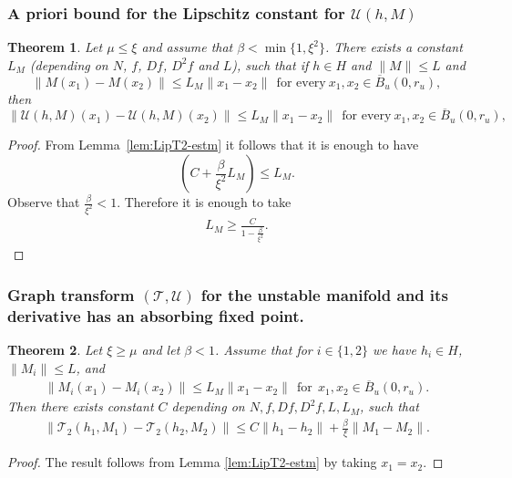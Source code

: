 \documentclass[11pt, leqno]{amsart}
\newtheorem{thm}{Theorem}[section]
\theoremstyle{definition}
\begin{document}
\subsubsection{A priori bound for the Lipschitz constant for $\mathcal{U}(h,M)$}
\begin{thm}
\label{thm:T2-a-priori-bnds}
  Let $\mu\leq \xi$ and assume that $\beta<\min\{1,\xi^2\}$. There exists a constant $L_M$ (depending on $N$, $f$, $Df$, $D^2f$ and $L$), such that  if $h \in H$  and $\|M\| \leq L $ and
   \begin{equation}
  \|M(x_1) - M(x_2)\| \leq L_M \|x_1-x_2\|\ \ \textrm{for every} \ x_1,x_2\in \overline{B}_u(0,r_u),  \label{eq:Lip-M}
\end{equation}
then
\begin{equation}
  \|\mathcal{U}(h,M)(x_1) - \mathcal{U}(h,M)(x_2)\| \leq L_M \|x_1-x_2\|\ \ \textrm{for every} \ x_1,x_2\in \overline{B}_u(0,r_u),  \label{eq:Lip-preserved}
\end{equation}
\end{thm}
\begin{proof}
From Lemma~\ref{lem:LipT2-estm}  it follows that it is enough to have
\begin{equation*}
  \left(C + \frac{\beta}{\xi^2} L_M \right)  \leq L_M.
\end{equation*}
Observe that $\frac{\beta}{\xi^2} < 1$.
Therefore it is enough to take
\begin{eqnarray*}
  L_M \geq \frac{C}{1 - \frac{\beta}{\xi^2} }.
\end{eqnarray*}
\end{proof}





\subsubsection{Graph transform  $(\mathcal{T}, \mathcal{U})$ for the unstable manifold and its derivative has an absorbing fixed point.}

\begin{thm}
\label{thm:DT-contr}
Let $\xi\geq \mu$ and let $\beta<1$. Assume that for $i\in \{1,2\}$ we have $h_i\in H$, $\|M_i\| \leq L$, and
\begin{eqnarray}
	\|M_i(x_1) - M_i(x_2)\| \leq L_M \|x_1 - x_2\|\ \ \textrm{for}\ \ x_1,x_2\in \overline{B}_u(0,r_u).
\end{eqnarray}
 Then there exists constant $C$ depending on $N, f, Df, D^2f, L,L_M$, such that
\begin{eqnarray*}
  \| \mathcal{T}_2(h_1,M_1) -  \mathcal{T}_2(h_2,M_2) \| \leq C \|h_1 - h_2\| + \frac{\beta}{\xi}\|M_1 - M_2\|.
\end{eqnarray*}
\end{thm}
\begin{proof}
	The result follows from Lemma \ref{lem:LipT2-estm} by taking $x_1=x_2$.
	\end{proof}
\end{document}
